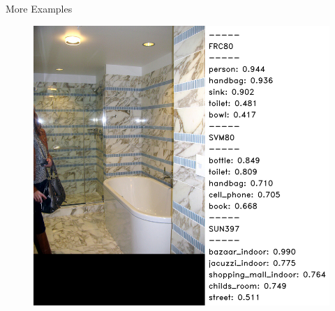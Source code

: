 \documentclass{beamer}
\begin{document}
\begin{frame}{More Examples}
\begin{figure}[h]
\begin{columns}
    \hspace{-5mm}
    \centering
    \includegraphics[width=1.2\textwidth]{images/69223.png}
    \end{columns}
  \end{figure}
\end{frame}
\end{document}
